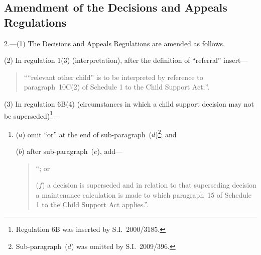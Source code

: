 \documentclass[12pt,a4paper]{article}
\begin{document}
\subsection[2. Amendment of the Decisions and Appeals Regulations]{Amendment of the Decisions and Appeals Regulations}

2.---(1)  The Decisions and Appeals Regulations are amended as follows.

(2) In regulation 1(3) (interpretation), after the definition of “referral” insert—
\begin{quotation}
““relevant other child” is to be interpreted by reference to paragraph~10C(2) of Schedule 1 to the Child Support Act;”.
\end{quotation}

(3) In regulation 6B(4) (circumstances in which a child support decision may not be superseded)\footnote{Regulation 6B was inserted by S.I.~2000/3185.}—
\begin{enumerate}\item[]
($a$) omit “or” at the end of sub-paragraph~($d$)\footnote{Sub-paragraph~($d$)  was omitted by S.I.~2009/396.}; and

($b$) after sub-paragraph~($e$), add—
\begin{quotation}
“; or

($f$) a decision is superseded and in relation to that superseding decision a maintenance calculation is made to which paragraph~15 of Schedule 1 to the Child Support Act applies.”.
\end{quotation}
\end{enumerate}
\end{document}
